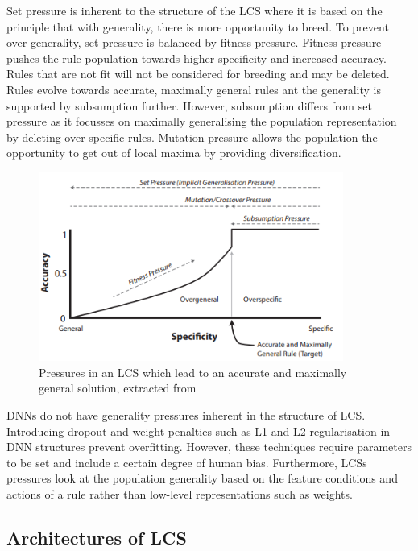 Set pressure is inherent to the structure of the LCS where it is based on the principle that with generality, there is more opportunity to breed. To prevent over generality, set pressure is balanced by fitness pressure. Fitness pressure pushes the rule population towards higher specificity and increased accuracy. Rules that are not fit will not be considered for breeding and may be deleted. Rules evolve towards accurate, maximally general rules ant the generality is supported by subsumption further. However, subsumption differs from set pressure as it focusses on maximally generalising the population representation by deleting over specific rules. Mutation pressure allows the population the opportunity to get out of local maxima by providing diversification. 

\begin{figure}
	\begin{center}
		\includegraphics[width=100mm, scale=0.5]{LCSpressures.png}
		\caption{Pressures in an LCS which lead to an accurate and maximally general solution, extracted from \cite{urbanowicz2017introduction}}
		\label{fig:pressureGraph}
	\end{center}
	
\end{figure}

DNNs do not have generality pressures inherent in the structure of LCS. Introducing dropout \cite{srivastava2014dropout} and weight penalties such as L1 and L2 regularisation  \cite{srivastava2014dropout} in DNN structures prevent overfitting. However, these techniques require parameters to be set and include a certain degree of human bias. Furthermore, LCSs pressures look at the population generality based on the feature conditions and actions of a rule rather than low-level representations such as weights. 

\subsection{Architectures of LCS}

